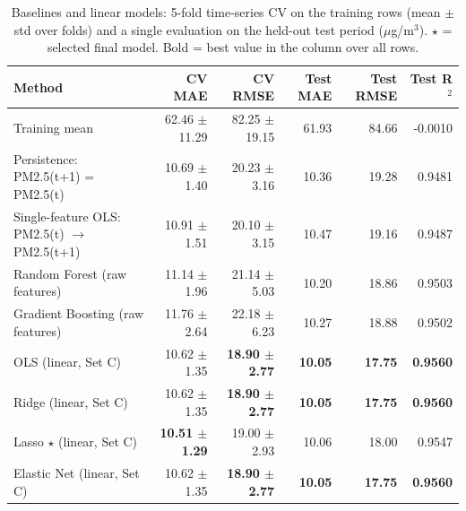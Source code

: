 \begin{table}[t]
\centering
\small
\caption{Baselines and linear models: 5-fold time-series CV on the training rows (mean $\pm$ std over folds) and a single evaluation on the held-out test period ($\mu$g/m$^3$). $\star$ = selected final model. Bold = best value in the column over all rows.}
\label{tab:table_3_model_comparison}
\begin{tabular}{lrrrrr}
\toprule
Method & CV MAE & CV RMSE & Test MAE & Test RMSE & Test R$^2$ \\
\midrule
Training mean & 62.46 $\pm$ 11.29 & 82.25 $\pm$ 19.15 & 61.93 & 84.66 & -0.0010 \\
Persistence: PM2.5(t+1) = PM2.5(t) & 10.69 $\pm$ 1.40 & 20.23 $\pm$ 3.16 & 10.36 & 19.28 & 0.9481 \\
Single-feature OLS: PM2.5(t) $\rightarrow$ PM2.5(t+1) & 10.91 $\pm$ 1.51 & 20.10 $\pm$ 3.15 & 10.47 & 19.16 & 0.9487 \\
Random Forest (raw features) & 11.14 $\pm$ 1.96 & 21.14 $\pm$ 5.03 & 10.20 & 18.86 & 0.9503 \\
Gradient Boosting (raw features) & 11.76 $\pm$ 2.64 & 22.18 $\pm$ 6.23 & 10.27 & 18.88 & 0.9502 \\
OLS (linear, Set C) & 10.62 $\pm$ 1.35 & \textbf{18.90 $\pm$ 2.77} & \textbf{10.05} & \textbf{17.75} & \textbf{0.9560} \\
Ridge (linear, Set C) & 10.62 $\pm$ 1.35 & \textbf{18.90 $\pm$ 2.77} & \textbf{10.05} & \textbf{17.75} & \textbf{0.9560} \\
Lasso $\star$ (linear, Set C) & \textbf{10.51 $\pm$ 1.29} & 19.00 $\pm$ 2.93 & 10.06 & 18.00 & 0.9547 \\
Elastic Net (linear, Set C) & 10.62 $\pm$ 1.35 & \textbf{18.90 $\pm$ 2.77} & \textbf{10.05} & \textbf{17.75} & \textbf{0.9560} \\
\bottomrule
\end{tabular}
\end{table}
